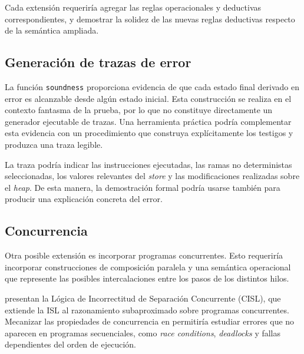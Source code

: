 \documentclass[a4paper,	11pt]{report}
\begin{document}
Cada extensión requeriría agregar las reglas operacionales y deductivas correspondientes,
y demostrar la solidez de las nuevas reglas deductivas respecto de la semántica ampliada.

\subsection*{Generación de trazas de error}
La función \lstinline|soundness| proporciona evidencia de que cada estado final derivado en error es alcanzable desde algún estado inicial.
Esta construcción se realiza en el contexto fantasma de la prueba,
por lo que no constituye directamente un generador ejecutable de trazas.
Una herramienta práctica podría complementar esta evidencia con un procedimiento que construya explícitamente los testigos y produzca una traza legible.

La traza podría indicar las instrucciones ejecutadas, las ramas no deterministas seleccionadas,
los valores relevantes del \emph{store} y las modificaciones realizadas sobre el \emph{heap}.
De esta manera,
la demostración formal podría usarse también para producir una explicación concreta del error.

\subsection*{Concurrencia}
Otra posible extensión es incorporar programas concurrentes.
Esto requeriría incorporar construcciones de composición paralela y una semántica operacional
que represente las posibles intercalaciones entre los pasos de los distintos hilos.

\citet{cisl} presentan la Lógica de Incorrectitud de Separación Concurrente (CISL),
que extiende la ISL al razonamiento subaproximado sobre programas concurrentes.
Mecanizar las propiedades de concurrencia en \fstar{} permitiría estudiar errores que no aparecen en programas secuenciales,
como \emph{race conditions}, \emph{deadlocks} y fallas dependientes del orden de ejecución.




\end{document}
